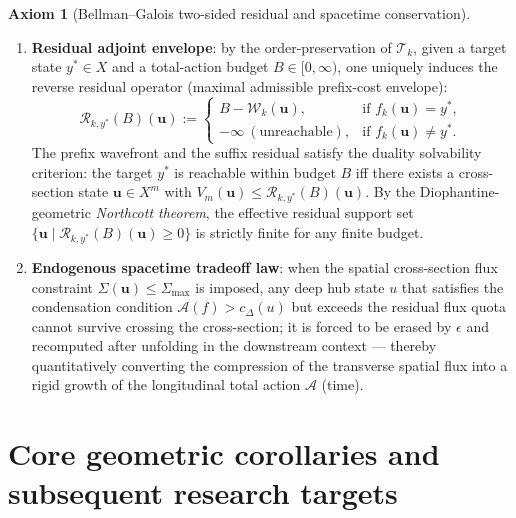 \documentclass[11pt,a4paper]{article}
\theoremstyle{definition}
\newtheorem{axiom}{Axiom}[section]
\theoremstyle{remark}
\newcommand{\cA}{\mathcal{A}}
\newcommand{\cW}{\mathcal{W}}
\newcommand{\cT}{\mathcal{T}}
\newcommand{\cR}{\mathcal{R}}
\begin{document}
\begin{axiom}[Bellman--Galois two-sided residual and spacetime conservation]
\label{ax:residual}
\begin{enumerate}
\item \textbf{Residual adjoint envelope}: by the order-preservation of $\cT_k$,
given a target state $y^* \in X$ and a total-action budget $B \in [0, \infty)$,
one uniquely induces the reverse residual operator (maximal admissible
prefix-cost envelope):
\[
\cR_{k, y^*}(B)(\mathbf{u}) :=
\begin{cases}
B - \cW_k(\mathbf{u}), & \text{if } f_k(\mathbf{u}) = y^*, \\
-\infty \ (\text{unreachable}), & \text{if } f_k(\mathbf{u}) \neq y^*.
\end{cases}
\]
The prefix wavefront and the suffix residual satisfy the duality solvability
criterion: the target $y^*$ is reachable within budget $B$ iff there exists a
cross-section state $\mathbf{u} \in X^m$ with
$V_m(\mathbf{u}) \le \cR_{k, y^*}(B)(\mathbf{u})$.  By the Diophantine-geometric
\emph{Northcott theorem}, the effective residual support set
$\{\mathbf{u} \mid \cR_{k, y^*}(B)(\mathbf{u}) \ge 0\}$ is strictly finite for
any finite budget.
\item \textbf{Endogenous spacetime tradeoff law}: when the spatial cross-section
flux constraint $\Sigma(\mathbf{u}) \le \Sigma_{\max}$ is imposed, any deep hub
state $u$ that satisfies the condensation condition $\cA(f) > c_\Delta(u)$ but
exceeds the residual flux quota cannot survive crossing the cross-section; it is
forced to be erased by $\epsilon$ and recomputed after unfolding in the
downstream context --- thereby quantitatively converting the compression of the
transverse spatial flux into a rigid growth of the longitudinal total action
$\cA$ (time).
\end{enumerate}
\end{axiom}

\section{Core geometric corollaries and subsequent research targets}
\end{document}

